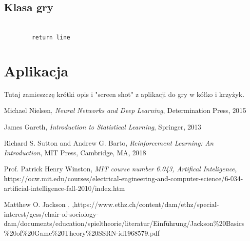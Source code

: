 \documentclass[licencjacka]{pracamgr}
\begin{document}
\section{Klasa gry}

\begin{lstlisting}
        
        return line

\end{lstlisting}

\chapter{Aplikacja}

Tutaj zamieszczę krótki opis i "screen shot" z aplikacji do gry w kółko i krzyżyk.

\begin{thebibliography}{99}


	 Michael Nielsen, \textit{Neural Networks and Deep Learning}, Determination Press, 2015

	 James Gareth, \textit{Introduction to Statistical Learning}, Springer, 2013
	
	 Richard S. Sutton and Andrew G. Barto, \textit{Reinforcement Learning: An Introduction},  MIT Press, Cambridge, MA, 2018
	
	 Prof. Patrick Henry Winston, \textit{MIT course number 6.043, Artifical Inteligence}, https://ocw.mit.edu/courses/electrical-engineering-and-computer-science/6-034-artificial-intelligence-fall-2010/index.htm
	
	 Matthew O. Jackson , ,\linebreak https://www.ethz.ch/content/dam/ethz/special-interest/gess/chair-of-sociology-dam/documents/education/spieltheorie/literatur/Einführung/Jackson\linebreak\%20Basics\%20of\%20Game\%20Theory\%20SSRN-id1968579.pdf

\end{thebibliography}
\end{document}
